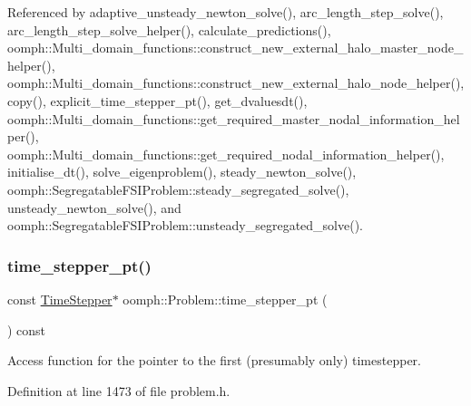 Referenced by adaptive\+\_\+unsteady\+\_\+newton\+\_\+solve(), arc\+\_\+length\+\_\+step\+\_\+solve(), arc\+\_\+length\+\_\+step\+\_\+solve\+\_\+helper(), calculate\+\_\+predictions(), oomph\+::\+Multi\+\_\+domain\+\_\+functions\+::construct\+\_\+new\+\_\+external\+\_\+halo\+\_\+master\+\_\+node\+\_\+helper(), oomph\+::\+Multi\+\_\+domain\+\_\+functions\+::construct\+\_\+new\+\_\+external\+\_\+halo\+\_\+node\+\_\+helper(), copy(), explicit\+\_\+time\+\_\+stepper\+\_\+pt(), get\+\_\+dvaluesdt(), oomph\+::\+Multi\+\_\+domain\+\_\+functions\+::get\+\_\+required\+\_\+master\+\_\+nodal\+\_\+information\+\_\+helper(), oomph\+::\+Multi\+\_\+domain\+\_\+functions\+::get\+\_\+required\+\_\+nodal\+\_\+information\+\_\+helper(), initialise\+\_\+dt(), solve\+\_\+eigenproblem(), steady\+\_\+newton\+\_\+solve(), oomph\+::\+Segregatable\+F\+S\+I\+Problem\+::steady\+\_\+segregated\+\_\+solve(), unsteady\+\_\+newton\+\_\+solve(), and oomph\+::\+Segregatable\+F\+S\+I\+Problem\+::unsteady\+\_\+segregated\+\_\+solve().

\mbox{\label{classoomph_1_1Problem_a3f952a57b5238978250849c04e2fcbdb}} 
\subsubsection{\texorpdfstring{time\+\_\+stepper\+\_\+pt()}{time\_stepper\_pt()}\hspace{0.1cm}{\footnotesize\ttfamily [2/3]}}
{\footnotesize\ttfamily const \hyperlink{classoomph_1_1TimeStepper}{Time\+Stepper}$\ast$ oomph\+::\+Problem\+::time\+\_\+stepper\+\_\+pt (\begin{DoxyParamCaption}{ }\end{DoxyParamCaption}) const\hspace{0.3cm}{\ttfamily [inline]}}



Access function for the pointer to the first (presumably only) timestepper. 



Definition at line 1473 of file problem.\+h.

\mbox{\label{classoomph_1_1Problem_a8097472ce262ca85c4b0b4427cbe5d56}} 
